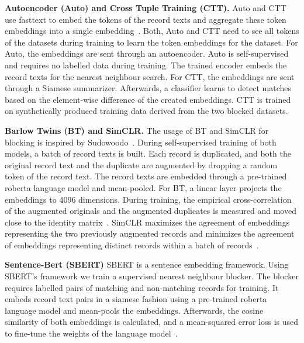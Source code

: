 \documentclass[sigconf,nonacm]{acmart}
\begin{document}
\vspace{.1cm}\noindent\textbf{Autoencoder (Auto) and Cross Tuple Training (CTT).} Auto and CTT use fasttext to embed the tokens of the record texts and aggregate these token embeddings into a single embedding~\cite{thirumuruganathan_deep_2021}. Both, Auto and CTT need to see all tokens of the datasets during training to learn the token embeddings for the dataset. For Auto, the embeddings are sent through an autoencoder. Auto is self-supervised and requires no labelled data during training. The trained encoder embeds the record texts for the nearest neighbour search. For CTT, the embeddings are sent through a Siamese summarizer.
Afterwards, a classifier learns to detect matches based on the element-wise difference of the created embeddings. CTT is trained on synthetically produced training data derived from the two blocked datasets.


\vspace{.1cm}\noindent\textbf{Barlow Twins (BT) and SimCLR.} The usage of BT and SimCLR for blocking is inspired by Sudowoodo~\cite{wang_sudowoodo_2022}.
During self-supervised training of both models, a batch of record texts is built.
Each record is duplicated, and both the original record text and the duplicate are augmented by dropping a random token of the record text.
The record texts are embedded through a pre-trained roberta language model and mean-pooled. For BT, a linear layer projects the embeddings to 4096 dimensions. 
During training, the empirical cross-correlation of the augmented originals and the augmented duplicates is measured and moved close to the identity matrix~\cite{zbontar_barlow_2021}.
SimCLR maximizes the agreement of embeddings representing the two previously augmented records and minimizes the agreement of embeddings representing distinct records within a batch of records~\cite{chen_simple_2020}.




\vspace{.1cm}\noindent\textbf{Sentence-Bert (SBERT)} SBERT is a sentence embedding framework. Using SBERT's framework we train a supervised nearest neighbour blocker. The blocker requires labelled pairs of matching and non-matching records for training. It embeds record text pairs in a siamese fashion using a pre-trained roberta language model and mean-pools the embeddings.
Afterwards, the cosine similarity of both embeddings is calculated, and a mean-squared error loss is used to fine-tune the weights of the language model~\cite{reimers_sentence-bert_2019}.
\end{document}
